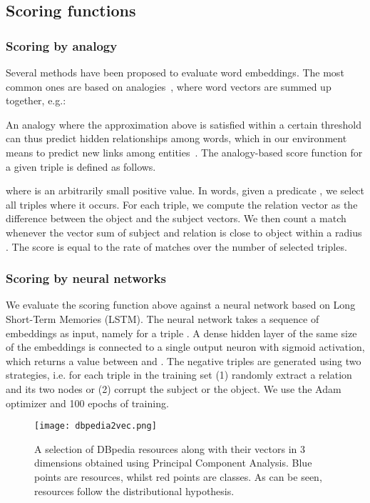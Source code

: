 \documentclass[graybox]{archivesofdatascience}
\begin{document}
\subsection{Scoring functions}

\subsubsection{Scoring by analogy}

Several methods have been proposed to evaluate word embeddings.
The most common ones are based on analogies~\citep{mikolov2013linguistic,levy2014linguistic}, where word vectors are summed up together, e.g.:

An analogy where the approximation above is satisfied within a certain threshold can thus predict hidden relationships among words, which in our environment means to predict new links among entities~\cite{ristoski2016rdf2vec}.
The analogy-based score function for a given triple  is defined as follows.

where  is an arbitrarily small positive value.
In words, given a predicate , we select all triples where it occurs.
For each triple, we compute the relation vector as the difference between the object and the subject vectors.
We then count a match whenever the vector sum of subject  and relation is close to object  within a radius .
The score is equal to the rate of matches over the number of selected triples.

\subsubsection{Scoring by neural networks}

We evaluate the scoring function above against a neural network based on Long Short-Term Memories (LSTM).
The neural network takes a sequence of embeddings as input, namely  for a triple .
A dense hidden layer of the same size of the embeddings is connected to a single output neuron with sigmoid activation, which returns a value between  and .
The negative triples are generated using two strategies, i.e. for each triple in the training set (1) randomly extract a relation and its two nodes or (2) corrupt the subject or the object.
We use the Adam optimizer and 100 epochs of training.

\begin{figure}[t]
    \sidecaption
\texttt{[image: dbpedia2vec.png]}
    \caption{A selection of DBpedia resources along with their vectors in 3 dimensions obtained using Principal Component Analysis. Blue points are resources, whilst red points are classes. As can be seen, resources follow the distributional hypothesis.}
    \label{fig:dbpedia2vec}
\end{figure}
\end{document}
